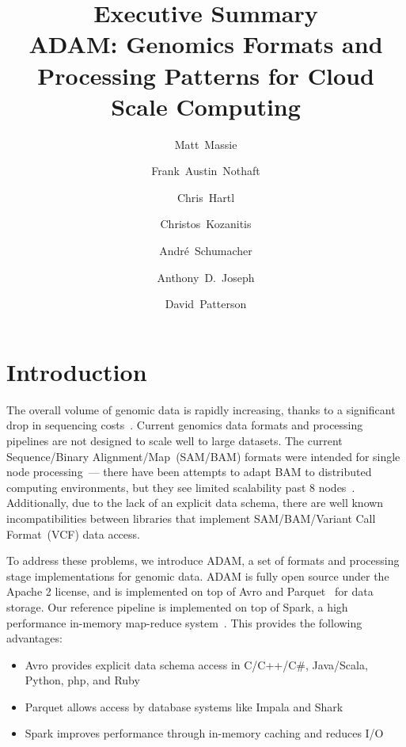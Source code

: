 \documentclass[10pt]{article}
\date{}
\begin{document}
\title{\textbf{Executive Summary}\\ADAM: Genomics Formats and Processing Patterns for Cloud Scale Computing}
\author[1]{Matt~Massie}
\author[1]{Frank~Austin~Nothaft}
\author[1,2]{Chris~Hartl}
\author[1]{Christos~Kozanitis}
\author[3]{Andr\'{e}~Schumacher}
\author[1]{Anthony~D.~Joseph}
\author[1]{David~Patterson}

\maketitle

\section{Introduction}

The overall volume of genomic data is rapidly increasing, thanks to a significant drop in sequencing costs~\cite{nhgri}.
Current genomics data formats and processing pipelines are not designed to scale well to large datasets. The current
Sequence/Binary Alignment/Map~(SAM/BAM) formats were intended for single node processing~\cite{li09}--- there have been
attempts to adapt BAM to distributed computing environments, but they see limited scalability past 8 nodes~\cite{niemenmaa12}. 
Additionally, due to the lack of an explicit data schema, there are well known incompatibilities between libraries that implement
SAM/BAM/Variant Call Format~(VCF) data access.

To address these problems, we introduce ADAM, a set of formats and processing stage implementations for genomic data.
ADAM is fully open source under the Apache 2 license, and is implemented on top of Avro and Parquet~\cite{avro, parquet}
for data storage. Our reference pipeline is implemented on top of Spark, a high performance in-memory map-reduce
system~\cite{zaharia10}. This provides the following advantages:

\begin{itemize}
\item Avro provides explicit data schema access in C/C++/C\#, Java/Scala, Python, php, and Ruby
\item Parquet allows access by database systems like Impala and Shark
\item Spark improves performance through in-memory caching and reduces I/O
\end{itemize}
\end{document}
